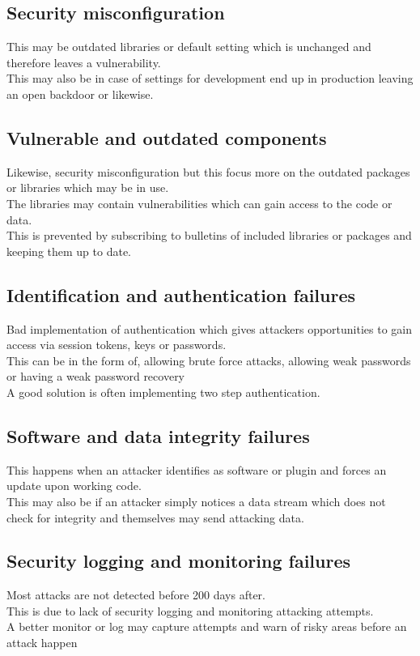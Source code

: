 \documentclass[12pt, a4paper]{article}
\begin{document}
		\subsection{Security misconfiguration}
			This may be outdated libraries or default setting which is unchanged and therefore leaves a vulnerability.\\
			This may also be in case of settings for development end up in production leaving an open backdoor or likewise.
		\subsection{Vulnerable and outdated components}
			Likewise, security misconfiguration but this focus more on the outdated packages or libraries which may be in use.\\
			The libraries may contain vulnerabilities which can gain access to the code or data.\\
			This is prevented by subscribing to bulletins of included libraries or packages and keeping them up to date.
		\subsection{Identification and authentication failures}
			Bad implementation of authentication which gives attackers opportunities to gain access via session tokens, keys or passwords.\\
			This can be in the form of, allowing brute force attacks, allowing weak passwords or having a weak password recovery\\
			A good solution is often implementing two step authentication.
		\subsection{ Software and data integrity failures}
			This happens when an attacker identifies as software or plugin and forces an update upon working code.\\
			This may also be if an attacker simply notices a data stream which does not check for integrity and themselves may send attacking data.
		\subsection{Security logging and monitoring failures}
			Most attacks are not detected before 200 days after.\\
			This is due to lack of security logging and monitoring attacking attempts.\\
			A better monitor or log may capture attempts and warn of risky areas before an attack happen
\end{document}
